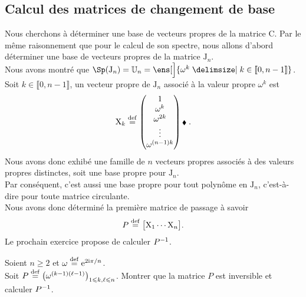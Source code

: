 \subsection{Calcul des matrices de changement de base}

Nous cherchons à déterminer une base de vecteurs propres de la matrice $\mathrm{C}$. Par le même raisonnement que pour le calcul de son spectre, nous allons d'abord déterminer une base de vecteurs propres de la matrice $\mathrm{J}_n$. \\
Nous avons montré que $\Sp(\mathrm{J}_n) = \mathbb{U}_n = \ens[\Big]{ \omega^k \tq k \in \llbracket 0, n-1 \rrbracket }$. \\
Soit $k \in \llbracket 0, n-1 \rrbracket$, un vecteur propre de $\mathrm{J}_n$ associé à la valeur propre $\omega^k$ est
$$
\mathrm{X}_k \overset{\mathrm{\tiny def}}{=}
\begin{pmatrix}
    1 \\
    \omega^k \\
    \omega^{2k} \\
    \vdots \\
    \omega^{(n-1)k}
\end{pmatrix} \hbox{\scriptsize $\blacklozenge$\ }.
$$
Nous avons donc exhibé une famille de $n$ vecteurs propres associés à des valeurs propres distinctes, soit une base propre pour $\mathrm{J}_n$. \\
Par conséquent, c'est aussi une base propre pour tout polynôme en $\mathrm{J}_n$, c'est-à-dire pour toute matrice circulante. \\
Nous avons donc déterminé la première matrice de passage à savoir
$$P \overset{\mathrm{\tiny def}}{=} \big[ \mathrm{X}_1 \cdots \mathrm{X}_n \big].$$
Le prochain exercice propose de calculer $P^{-1}$.
\begin{exercice}
    Soient $n \geqslant 2$ et $\omega \overset{\mathrm{\tiny def}}{=} \mathrm{e}^{2 \mathrm{i} \pi / n}$. \\
    Soit $P \overset{\mathrm{\tiny def}}{=} \big( \omega^{(k-1)(\ell-1)} \big)_{1 \leqslant k, \ell \leqslant n}$. Montrer que la matrice $P$ est inversible et calculer $P^{-1}$.
\end{exercice}

